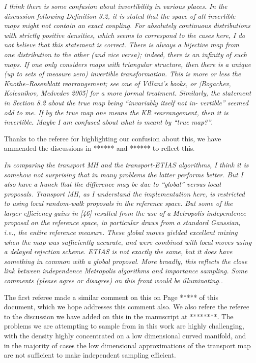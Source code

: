 \documentclass{article}
\newcommand{\comment}[2]{\vspace{0.6cm}{\bf Comment:} {\it #1.}

\vspace{0.3cm}{\bf Answer:} #2}
\begin{document}
\comment{I think there is some confusion about invertibility in various places.
In the discussion following Definition 3.2, it is stated that the space of all invertible maps might not contain an exact coupling. For absolutely continuous distributions with strictly positive densities, which seems to correspond to the cases here, I do not believe that this statement is correct. There is always a bijective map from one distribution to the other (and vice versa); indeed, there is an infinity of such maps. If one only considers maps with triangular structure, then there is a unique (up to sets of measure zero) invertible transformation. This is more or less the Knothe–Rosenblatt rearrangement; see one of Villani’s books, or [Bogachev, Kolesnikov, Medvedev 2005] for a more formal treatment.
Similarly, the statement in Section 8.2 about the true map being “invariably itself not in- vertible” seemed odd to me. If by the true map one means the KR rearrangement, then it is invertible. Maybe I am confused about what is meant by “true map?”}{Thanks to the referee for highlighting our confusion about this, we have ammended the discussions in ****** and ****** to reflect this.}

\comment{ In comparing the transport MH and the transport-ETIAS algorithms, I think it is somehow not surprising that in many problems the latter performs better. But I also have a hunch that the difference may be due to “global” versus local proposals. Transport MH, as I understand the implementation here, is restricted to using local random-walk proposals in the reference space. But some of the larger efficiency gains in [46] resulted from the use of a Metropolis independence proposal on the reference space, in particular draws from a standard Gaussian, i.e., the entire reference measure. These global moves yielded excellent mixing when the map was sufficiently accurate, and were combined with local moves using a delayed rejection scheme. ETIAS is not exactly the same, but it does have something in common with a global proposal. More broadly, this reflects the close link between independence Metropolis algorithms and importance sampling. Some comments (please agree or disagree) on this front would be illuminating.}{The first referee made a similar comment on this on Page ***** of this document, which we hope addresses this comment also. We also refere the referee to the discussion we have added on this in the manuscript at ********. The problems we are attempting to sample from in this work are highly challenging, with the density highly concentrated on a low dimensional curved manifold, and in the majority of cases the low dimensional approximations of the transport map are not sufficient to make independent sampling efficient.}
\end{document}
